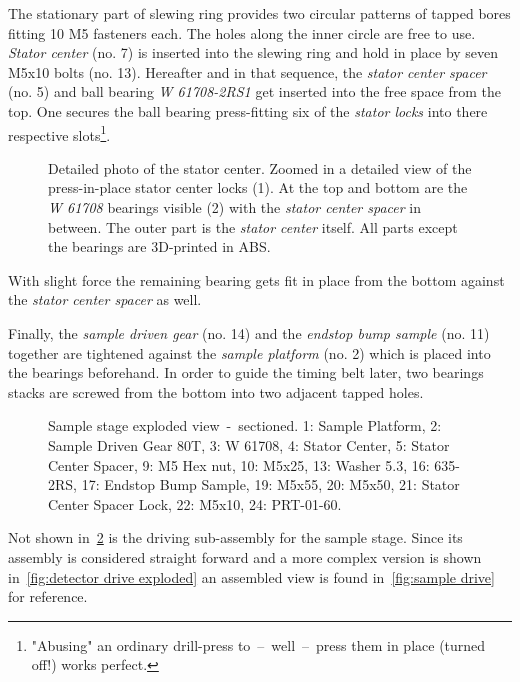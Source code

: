             The stationary part of slewing ring provides two circular patterns of tapped bores fitting 10 M5 fasteners each.
            The holes along the inner circle are free to use.
            \textit{Stator center} (no. 7) is inserted into the slewing ring and hold in place by seven M5x10 bolts (no. 13).
            Hereafter and in that sequence, the \textit{stator center spacer} (no. 5) and ball bearing \textit{W 61708-2RS1} get inserted into the free space from the top.
            One secures the ball bearing press-fitting six of the \textit{stator locks} into there respective slots\footnote{ "Abusing" an ordinary drill-press to~--~well~--~press them in place (turned off!) works perfect.}.
            \begin{figure}[h]
                \centering
                
                \caption[Detailed photo of the stator center]{Detailed photo of the stator center. Zoomed in a detailed view of the press-in-place stator center locks (1). At the top and bottom are the \textit{W 61708} bearings visible (2) with the \textit{stator center spacer} in between. The outer part is the \textit{stator center} itself. All parts except the bearings are 3D-printed in ABS.}
                \label{fig:detailed view of the stator center}
            \end{figure}
            With slight force the remaining bearing gets fit in place from the bottom against the \textit{stator center spacer} as well.
            
            Finally, the \textit{sample driven gear} (no. 14) and the \textit{endstop bump sample} (no. 11) together are tightened against the \textit{sample platform} (no. 2) which is placed into the bearings beforehand.
            In order to guide the timing belt later, two bearings stacks are screwed from the bottom into two adjacent tapped holes.

            \begin{figure}[h]
                \centering
                \caption[Sample stage exploded view~-~sectioned.]{Sample stage exploded view~-~sectioned. 1: Sample Platform, 2: Sample Driven Gear 80T, 3: W 61708, 4: Stator Center, 5: Stator Center Spacer, 9: M5 Hex nut, 10: M5x25, 13: Washer 5.3, 16: 635-2RS, 17: Endstop Bump Sample, 19: M5x55, 20: M5x50, 21: Stator Center Spacer Lock, 22: M5x10, 24: PRT-01-60.}%
                \label{fig:sample stage exploded section}%
            \end{figure}%
            Not shown in~\cref{fig:sample stage exploded section} is the driving sub-assembly for the sample stage.
            Since its assembly is considered straight forward and a more complex version is shown in~\cref{fig:detector drive exploded} an assembled view is found in~\cref{fig:sample drive} for reference.

